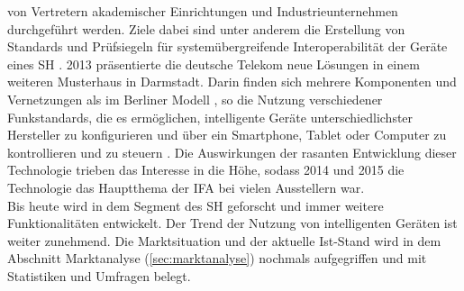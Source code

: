         von Vertretern akademischer Einrichtungen und Industrieunternehmen %
        durchgeführt werden. Ziele dabei sind unter anderem die Erstellung von Standards und Prüfsiegeln für 
        systemübergreifende Interoperabilität der Geräte eines \acl{SH} \cite{vde-smartAndBuilding}. 
        2013 präsentierte die deutsche Telekom neue Lösungen in einem weiteren Musterhaus in Darmstadt. 
        Darin finden sich mehrere Komponenten und Vernetzungen als im Berliner Modell \cite{telekom_SH}, so die 
        Nutzung verschiedener Funkstandards, die es ermöglichen, intelligente Geräte 
        unterschiedlichster Hersteller zu konfigurieren und über ein Smartphone, Tablet oder Computer zu kontrollieren 
        und zu steuern \cite{telekom_SH}. Die Auswirkungen der rasanten Entwicklung dieser Technologie trieben das 
        Interesse in die Höhe, sodass 2014 und 2015 die Technologie das Hauptthema der \ac{IFA} bei vielen 
        Ausstellern war.
        \\
        Bis heute wird in dem Segment des \acl{SH} geforscht und immer weitere Funktionalitäten entwickelt. Der Trend 
        der Nutzung von intelligenten Geräten ist weiter zunehmend. Die Marktsituation und der aktuelle Ist-Stand 
        wird in dem Abschnitt Marktanalyse (\ref{sec:marktanalyse}) nochmals aufgegriffen und mit Statistiken und Umfragen belegt.

